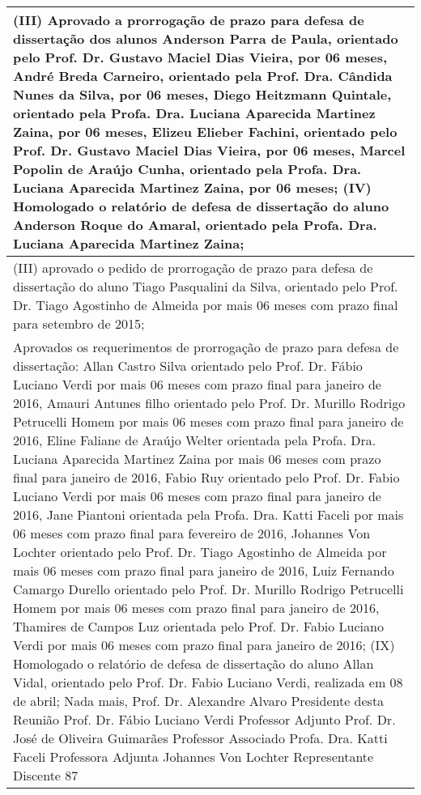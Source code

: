 
\begin{longtable}{|p{17.5cm}|}
\hline 
(III) Aprovado a prorrogação de prazo para defesa de dissertação dos alunos Anderson Parra de Paula, orientado pelo Prof. Dr. Gustavo Maciel Dias Vieira, por 06 meses, André Breda Carneiro, orientado pela Prof. Dra. Cândida Nunes da Silva, por 06 meses, Diego Heitzmann Quintale, orientado pela Profa. Dra. Luciana Aparecida Martinez Zaina, por 06 meses, Elizeu Elieber Fachini, orientado pelo Prof. Dr. Gustavo Maciel Dias Vieira, por 06 meses, Marcel Popolin de Araújo Cunha, orientado pela Profa. Dra. Luciana Aparecida Martinez Zaina, por 06 meses; (IV) Homologado o relatório de defesa de dissertação do aluno Anderson Roque do Amaral, orientado pela Profa. Dra. Luciana Aparecida Martinez Zaina;

 \\ \hline 
(III) aprovado o pedido de prorrogação de prazo para defesa de dissertação do aluno Tiago Pasqualini da Silva, orientado pelo Prof. Dr. Tiago Agostinho de Almeida por mais 06 meses com prazo final para setembro de 2015;

 \\ \hline 
Aprovados os requerimentos de prorrogação de prazo para defesa de dissertação: Allan Castro Silva orientado pelo Prof. Dr. Fábio Luciano Verdi por mais 06 meses com prazo final para janeiro de 2016, Amauri Antunes filho orientado pelo Prof. Dr. Murillo Rodrigo Petrucelli Homem por mais 06 meses com prazo final para janeiro de 2016, Eline Faliane de Araújo Welter orientada pela Profa. Dra. Luciana Aparecida Martinez Zaina por mais 06 meses com prazo final para janeiro de 2016, Fabio Ruy orientado pelo Prof. Dr. Fabio Luciano Verdi por mais 06 meses com prazo final para janeiro de 2016, Jane Piantoni orientada pela Profa. Dra. Katti Faceli por mais 06 meses com prazo final para fevereiro de 2016, Johannes Von Lochter orientado pelo Prof. Dr. Tiago Agostinho de Almeida por mais 06 meses com prazo final para janeiro de 2016, Luiz Fernando Camargo Durello orientado pelo Prof. Dr. Murillo Rodrigo Petrucelli Homem por mais 06 meses com prazo final para janeiro de 2016, Thamires de Campos Luz orientada pelo Prof. Dr. Fabio Luciano Verdi por mais 06 meses com prazo final para janeiro de 2016; (IX) Homologado o relatório de defesa de dissertação do aluno Allan Vidal, orientado pelo Prof. Dr. Fabio Luciano Verdi, realizada em 08 de abril; Nada mais, Prof. Dr. Alexandre Alvaro Presidente desta Reunião Prof. Dr. Fábio Luciano Verdi Professor Adjunto Prof. Dr. José de Oliveira Guimarães Professor Associado Profa. Dra. Katti Faceli Professora Adjunta Johannes Von Lochter Representante Discente 87


\end{longtable}
